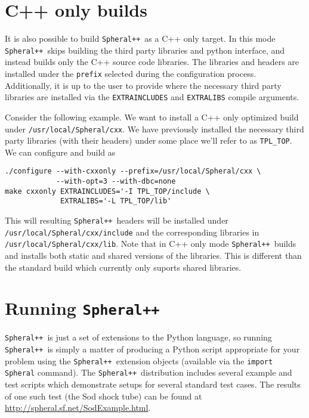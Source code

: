\documentclass{article}
\newcommand{\Spheral}{{\tt Spheral++}}
\begin{document}
\section{C++ only builds}

It is also possible to build \Spheral\ as a C++ only target.  In this mode
\Spheral\ skips building the third party libraries and python interface, and
instead builds only the C++ source code libraries.  The libraries and headers
are installed under the \verb.prefix. selected during the configuration process.
Additionally, it is up to the user to provide where the necessary third party
libraries are installed via the \verb.EXTRAINCLUDES. and
\verb.EXTRALIBS. compile arguments.

Consider the following example.  We want to install a C++ only optimized build under
\verb./usr/local/Spheral/cxx..  We have previously installed the necessary
third party libraries (with their headers) under some place we'll refer to as
\verb.TPL_TOP..  We can configure and build as

\begin{verbatim}
./configure --with-cxxonly --prefix=/usr/local/Spheral/cxx \
            --with-opt=3 --with-dbc=none 
make cxxonly EXTRAINCLUDES='-I TPL_TOP/include \
             EXTRALIBS='-L TPL_TOP/lib'
\end{verbatim}

This will resulting \Spheral\ headers will be installed under
\verb./usr/local/Spheral/cxx/include. and the corresponding libraries in
\verb./usr/local/Spheral/cxx/lib..
Note that in C++ only mode \Spheral\ builds and installs both static and shared
versions of the libraries.  This is different than the standard build which
currently only suports shared libraries.

\section{Running \Spheral}
\Spheral\ is just a set of extensions to the Python language, so running
\Spheral\ is simply a matter of producing a Python script appropriate for your
problem using the \Spheral\ extension objects (available via the
\verb+import Spheral+ command).  The \Spheral\ distribution includes several
example and test scripts which demonstrate setups for several standard test
cases.  The results of one such test (the Sod shock tube) can be found
at \newline \url{http://spheral.sf.net/SodExample.html}.
\end{document}
